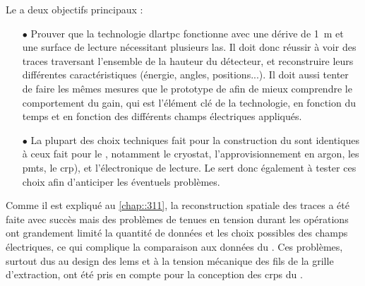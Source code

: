      Le \TOO{} a deux objectifs principaux :
      \begin{itemize}
        \item[$\bullet$] Prouver que la technologie \gls{dlartpc} fonctionne avec une dérive de \SI{1}{\meter} et une surface de lecture nécessitant plusieurs \gls{las}. Il doit donc réussir à voir des traces traversant l'ensemble de la hauteur du détecteur, et reconstruire leurs différentes caractéristiques (énergie, angles, positions...). Il doit aussi tenter de faire les mêmes mesures que le prototype de \threeL{} afin de mieux comprendre le comportement du gain, qui est l'élément clé de la technologie, en fonction du temps et en fonction des différents champs électriques appliqués.
        \item[$\bullet$] La plupart des choix techniques fait pour la construction du \TOO{} sont identiques à ceux fait pour le \SSS{}, notamment le cryostat, l'approvisionnement en argon, les \glspl{pmt}, le \gls{crp}), et l'électronique de lecture. Le \TOO{} sert donc également à tester ces choix afin d'anticiper les éventuels problèmes.
      \end{itemize}

      Comme il est expliqué au \autoref{chap::311}, la reconstruction spatiale des traces a été faite avec succès mais des problèmes de tenues en tension durant les opérations ont grandement limité la quantité de données et les choix possibles des champs électriques, ce qui complique la comparaison aux données du \threeL{}. Ces problèmes, surtout dus au design des \glspl{lem} et à la tension mécanique des fils de la grille d'extraction, ont été pris en compte pour la conception des \glspl{crp} du \SSS{}.

